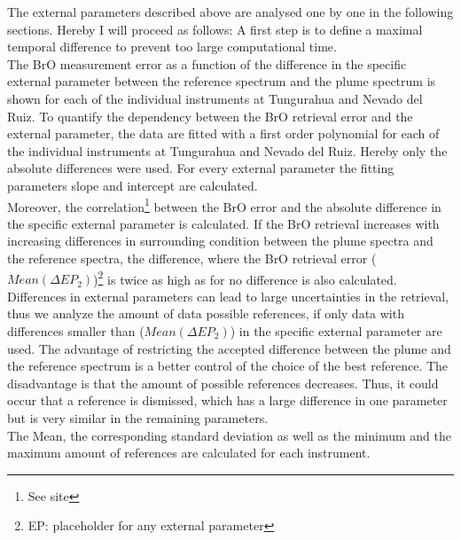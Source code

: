 The external parameters described above are analysed one by one in the following sections. Hereby I will proceed as follows:
A first step is to define a maximal temporal difference to prevent too large computational time.\\
The BrO measurement error as a function of the difference in the specific external parameter between the reference spectrum and the plume spectrum is shown for each of the individual instruments at Tungurahua and Nevado del Ruiz. 
To quantify the dependency between the BrO retrieval error and the external parameter, the data are fitted with a first order polynomial for each of the individual instruments at Tungurahua and Nevado del Ruiz. Hereby only the absolute differences were used. For every external parameter the fitting parameters slope and intercept are calculated.\\
Moreover, the correlation\footnote{See site \pageref{ff}}  between the BrO error and the absolute difference in the specific external parameter is calculated. If the BrO retrieval increases with increasing differences in surrounding condition between the plume spectra and the reference spectra, the difference, where the BrO retrieval error ($Mean(\Delta EP_{2})$)\footnote{EP: placeholder for any external parameter} is twice as high as for no difference is also calculated.\\  
Differences in external parameters can lead to large uncertainties in the retrieval, thus we analyze the amount of data possible references, if only data with differences smaller than ($Mean(\Delta EP_{2})$) in the specific external parameter are used. 
The advantage of restricting the accepted difference between the plume and the reference spectrum is a better control of the choice of the best reference. The disadvantage is that the amount of possible references decreases. Thus, it could occur that a reference is dismissed, which has a large difference in one parameter but is very similar in the remaining parameters.\\
The Mean, the corresponding standard deviation as well as the minimum and the maximum amount of references are calculated for each instrument.
\begin{center}
	\label{ff}
	
\end{center}
%	
